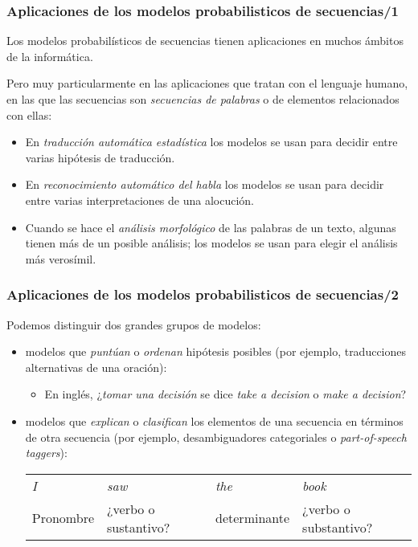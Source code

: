 \begin{frame}
  \frametitle{Aplicaciones de los modelos probabilisticos de secuencias/1}

Los modelos probabilísticos de secuencias tienen aplicaciones en muchos ámbitos de la informática.

Pero muy particularmente en las aplicaciones que tratan con el
lenguaje humano, en las que las secuencias son \emph{secuencias de
  palabras} o de elementos relacionados con ellas:
\begin{itemize}
\item En \emph{traducción automática estadística} los modelos se usan para decidir entre varias hipótesis de traducción.
\item En \emph{reconocimiento automático del habla} los modelos se usan para decidir entre varias interpretaciones de una alocución.
\item Cuando se hace el \emph{análisis morfológico} de las palabras de
  un texto, algunas tienen más de un posible análisis; los modelos se
  usan para elegir el análisis más verosímil.
\end{itemize}

\end{frame}

\begin{frame}
  \frametitle{Aplicaciones de los modelos probabilisticos de secuencias/2}

Podemos distinguir dos grandes grupos de modelos:
\begin{itemize}
\item modelos que \emph{puntúan} o \emph{ordenan} hipótesis posibles (por ejemplo, traducciones alternativas de una oración):
  \begin{itemize}
  \item En inglés, ¿\emph{tomar una decisión} se dice \emph{take a decision} o \emph{make a decision}?
  \end{itemize}
\item modelos que \emph{explican} o \emph{clasifican} los elementos de una secuencia en términos de otra secuencia (por ejemplo, desambiguadores categoriales o \emph{part-of-speech taggers}):
  \begin{tabular}{p{2cm}p{2cm}p{2cm}p{2cm}}
\emph{I} 	&\emph{saw} 	&\emph{the} 	&\emph{book}\\
Pronombre	&¿verbo o sustantivo? &determinante &¿verbo o substantivo?\\
   \end{tabular}
\end{itemize}

\end{frame}





